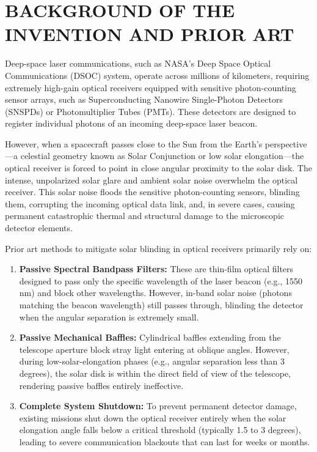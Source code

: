 \documentclass[12pt,a4paper]{article}
\begin{document}
\section*{BACKGROUND OF THE INVENTION AND PRIOR ART}
Deep-space laser communications, such as NASA's Deep Space Optical Communications (DSOC) system, operate across millions of kilometers, requiring extremely high-gain optical receivers equipped with sensitive photon-counting sensor arrays, such as Superconducting Nanowire Single-Photon Detectors (SNSPDs) or Photomultiplier Tubes (PMTs). These detectors are designed to register individual photons of an incoming deep-space laser beacon. 

However, when a spacecraft passes close to the Sun from the Earth's perspective---a celestial geometry known as Solar Conjunction or low solar elongation---the optical receiver is forced to point in close angular proximity to the solar disk. The intense, unpolarized solar glare and ambient solar noise overwhelm the optical receiver. This solar noise floods the sensitive photon-counting sensors, blinding them, corrupting the incoming optical data link, and, in severe cases, causing permanent catastrophic thermal and structural damage to the microscopic detector elements.

Prior art methods to mitigate solar blinding in optical receivers primarily rely on:
\begin{enumerate}
    \item \textbf{Passive Spectral Bandpass Filters:} These are thin-film optical filters designed to pass only the specific wavelength of the laser beacon (e.g., 1550 nm) and block other wavelengths. However, in-band solar noise (photons matching the beacon wavelength) still passes through, blinding the detector when the angular separation is extremely small.
    \item \textbf{Passive Mechanical Baffles:} Cylindrical baffles extending from the telescope aperture block stray light entering at oblique angles. However, during low-solar-elongation phases (e.g., angular separation less than 3 degrees), the solar disk is within the direct field of view of the telescope, rendering passive baffles entirely ineffective.
    \item \textbf{Complete System Shutdown:} To prevent permanent detector damage, existing missions shut down the optical receiver entirely when the solar elongation angle falls below a critical threshold (typically 1.5 to 3 degrees), leading to severe communication blackouts that can last for weeks or months.
\end{enumerate}
\end{document}
